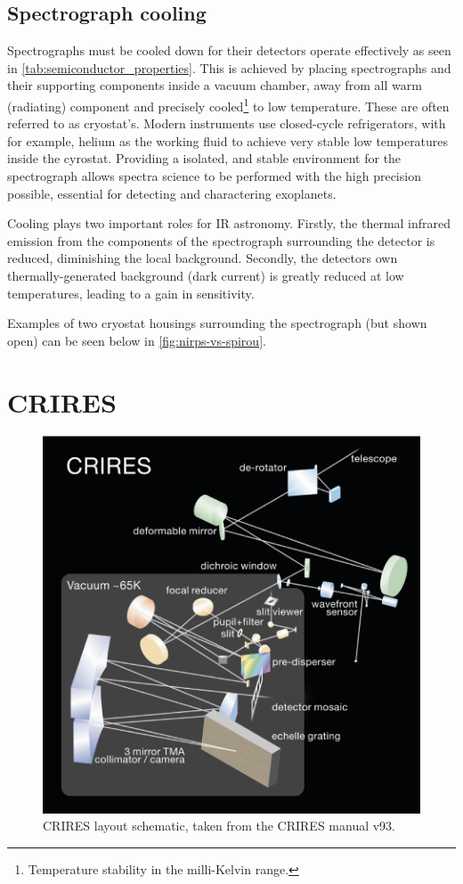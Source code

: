 \subsection{Spectrograph cooling}
\label{subsec:cold_spectrogrpah}
Spectrographs must be cooled down for their detectors operate effectively as seen in \cref{tab:semiconductor_properties}.
This is achieved by placing spectrographs and their supporting components inside a vacuum chamber, away from all warm (radiating) component and precisely cooled\footnote{Temperature stability in the milli-Kelvin range.} to low temperature.
These are often referred to as cryostat's.
Modern instruments use closed-cycle refrigerators, with for example, helium as the working fluid to achieve very stable low temperatures inside the cyrostat.
Providing a isolated, and stable environment for the spectrograph allows spectra science to be performed with the high precision possible, essential for detecting and charactering exoplanets.

Cooling plays two important roles for {IR} astronomy.
Firstly, the thermal infrared emission from the components of the spectrograph surrounding the detector is reduced, diminishing the local background.
Secondly, the detectors own thermally-generated background (dark current) is greatly reduced at low temperatures, leading to a gain in sensitivity.

Examples of two cryostat housings surrounding the spectrograph (but shown open) can be seen below in \cref{fig:nirps-vs-spirou}.


\section{CRIRES}
\label{sec:CRIRES}

\begin{figure}
    \centering
    \includegraphics[width=0.5\linewidth]{figures/spectroscopy/CRIRES_schematic.pdf}
    \caption{CRIRES layout schematic, taken from the {CRIRES} manual v93.}
    \label{fig:criresschematic}
\end{figure}

